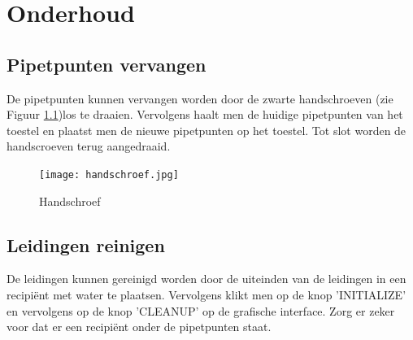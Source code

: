 \documentclass[a4paper,twoside,kulak]{kulakreport} %
\begin{document}
\chapter{Onderhoud} 

\section{Pipetpunten vervangen}

De pipetpunten kunnen vervangen worden door de zwarte handschroeven (zie Figuur \ref{fig: handschroef})los te draaien. Vervolgens haalt men de huidige pipetpunten van het toestel en plaatst men de nieuwe pipetpunten op het toestel. Tot slot worden de handscroeven terug aangedraaid. 

\begin{figure}[h]
	\centering
	\texttt{[image: handschroef.jpg]}
	\caption{Handschroef}
	\label{fig: handschroef}
\end{figure}

\section{Leidingen reinigen}

De leidingen kunnen gereinigd worden door de uiteinden van de leidingen in een recipiënt met water te plaatsen. Vervolgens klikt men op de knop 'INITIALIZE' en vervolgens op de knop 'CLEANUP' op de grafische interface. Zorg er zeker voor dat er een recipiënt onder de pipetpunten staat.
\end{document}
